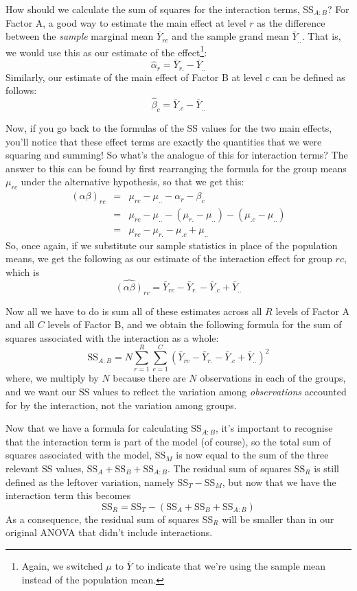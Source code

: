 \documentclass[
]{book}
\theoremstyle{definition}
\theoremstyle{definition}
\theoremstyle{definition}
\theoremstyle{definition}
\theoremstyle{remark}
\begin{document}
How should we calculate the sum of squares for the interaction terms, SS\(_{A:B}\)? For Factor A, a good way to estimate the main effect at level \(r\) as the difference between the \emph{sample} marginal mean \(\bar{Y}_{rc}\) and the sample grand mean \(\bar{Y}_{..}\). That is, we would use this as our estimate of the effect\footnote{Again, we switched \(\mu\) to \(\bar{Y}\) to indicate that we're using the sample mean instead of the population mean.}:
\[
\hat{\alpha}_r = \bar{Y}_{r.} - \bar{Y}_{..}
\]
Similarly, our estimate of the main effect of Factor B at level \(c\) can be defined as follows:
\[
\hat{\beta}_c = \bar{Y}_{.c} - \bar{Y}_{..}
\]

Now, if you go back to the formulas of the SS values for the two main effects, you'll notice that these effect terms are exactly the quantities that we were squaring and summing! So what's the analogue of this for interaction terms? The answer to this can be found by first rearranging the formula for the group means \(\mu_{rc}\) under the alternative hypothesis, so that we get this:
\begin{eqnarray*} 
(\alpha \beta)_{rc} &=& \mu_{rc} - \mu_{..} - \alpha_r - \beta_c \\
&=& \mu_{rc} - \mu_{..} - (\mu_{r.} - \mu_{..}) - (\mu_{.c} - \mu_{..}) \\
&=& \mu_{rc} - \mu_{r.} - \mu_{.c} + \mu_{..}
\end{eqnarray*}
So, once again, if we substitute our sample statistics in place of the population means, we get the following as our estimate of the interaction effect for group \(rc\), which is
\[
\hat{(\alpha\beta)}_{rc} = \bar{Y}_{rc} - \bar{Y}_{r.} - \bar{Y}_{.c} + \bar{Y}_{..}
\]

Now all we have to do is sum all of these estimates across all \(R\) levels of Factor A and all \(C\) levels of Factor B, and we obtain the following formula for the sum of squares associated with the interaction as a whole:
\[
\mbox{SS}_{A:B} = N \sum_{r=1}^R \sum_{c=1}^C \left( \bar{Y}_{rc} - \bar{Y}_{r.} - \bar{Y}_{.c} + \bar{Y}_{..} \right)^2
\]
where, we multiply by \(N\) because there are \(N\) observations in each of the groups, and we want our SS values to reflect the variation among \emph{observations} accounted for by the interaction, not the variation among groups.

Now that we have a formula for calculating SS\(_{A:B}\), it's important to recognise that the interaction term is part of the model (of course), so the total sum of squares associated with the model, SS\(_M\) is now equal to the sum of the three relevant SS values, \(\mbox{SS}_A + \mbox{SS}_B + \mbox{SS}_{A:B}\). The residual sum of squares \(\mbox{SS}_R\) is still defined as the leftover variation, namely \(\mbox{SS}_T - \mbox{SS}_M\), but now that we have the interaction term this becomes
\[
\mbox{SS}_R = \mbox{SS}_T - (\mbox{SS}_A + \mbox{SS}_B + \mbox{SS}_{A:B})
\]
As a consequence, the residual sum of squares SS\(_R\) will be smaller than in our original ANOVA that didn't include interactions.
\end{document}

